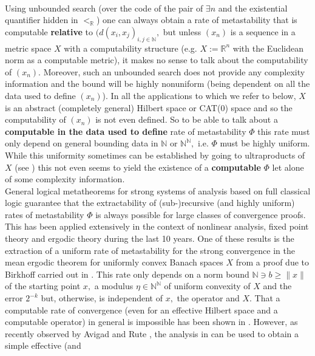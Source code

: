 \documentclass[1p]{elsarticle}
\newcommand{\RR}{\ensuremath{\mathbb{R}}}
\newcommand{\NN}{\ensuremath{\mathbb{N}}}
\theoremstyle{plain}
\theoremstyle{definition}
\theoremstyle{remark}
\theoremstyle{definition}
\begin{document}
\\[2mm] Using unbounded search (over the code of the 
pair of $\exists n$ and the existential quantifier hidden in $<_{\RR}$) one 
can always obtain a rate of metastability that is computable {\bf relative} to 
$(d(x_i,x_j)_{i,j\in\NN},$ but unless  $(x_n)$ is a sequence in a metric 
space $X$ with a computability 
structure (e.g. $X:=\RR^n$ with the Euclidean norm as a computable metric), 
it makes no sense to talk about the computability of $(x_n).$ 
Moreover, such an unbounded search does not provide any complexity 
information and the bound will be highly nonuniform (being dependent 
on all the data used to define 
$(x_n)$). In all the applications to which we refer to below, $X$ is an 
abstract (completely general) Hilbert space or CAT(0) space and so the 
computability of $(x_n)$ is not even defined. So to be able to talk about 
a {\bf computable in the data used to define} {} 
rate of metastability $\Phi$ this rate must only depend 
on general bounding data in $\NN$ or $\NN^{\NN},$ i.e. $\Phi$ must be 
highly uniform. While this uniformity sometimes can be established by 
going to ultraproducts of $X$ (see \cite{Avigad/Iovino}) this not even 
seems to yield the existence of a {\bf computable} $\Phi$ let alone  
of some complexity information.
\\[2mm] General logical metatheorems for strong systems of analysis based 
on full classical logic guarantee that the extractability of (sub-)recursive 
(and highly uniform) rates of metastability $\Phi$ is always possible for 
large classes of convergence proofs. This has been applied extensively in 
the context of nonlinear analysis, fixed point theory and ergodic theory 
during the last 10 years. One of these results is the extraction of a 
uniform rate of metastability for the strong convergence in the mean 
ergodic theorem for uniformly convex Banach spaces $X$ from a proof 
due to Birkhoff \cite{Bir39} carried out in 
\cite{Kohlenbach/Leustean4}. This rate only depends on a norm bound 
$\NN\ni b\ge \| x\|$ of the starting point $x,$ a modulus $\eta\in\NN^{\NN}$ 
of uniform convexity of $X$ and the error $2^{-k}$ but, otherwise, is 
independent of $x,$ the operator and $X.$  
That a computable rate of convergence (even 
for an effective Hilbert space and a computable operator) in general 
is impossible has been shown in \cite{Avigad/Gerhardy/Towsner}. However, 
as recently observed by Avigad and Rute \cite{Avigad/Rute}, the analysis 
in \cite{Kohlenbach/Leustean4} can be used to obtain a simple effective (and 
\end{document}
